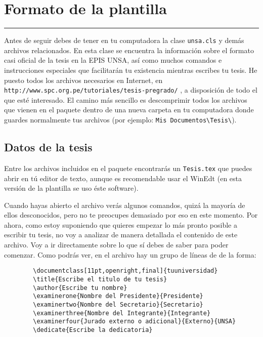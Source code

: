 \chapter{Formato de la plantilla}
\hrule \bigskip  \vspace*{1cm}

Antes de seguir debes de tener en tu computadora la clase
\verb"unsa.cls" y demás archivos relacionados. En esta clase se
encuentra la información sobre el formato casi oficial de la tesis
en la EPIS UNSA, así como muchos comandos e instrucciones
especiales que facilitarán tu existencia mientras escribes tu
tesis. He puesto todos los archivos necesarios en Internet, en
\texttt{http://www.spc.org.pe/tutoriales/tesis-pregrado/} , a
disposición de todo el que esté interesado. El camino más sencillo
es descomprimir todos los archivos que vienen en el paquete dentro
de una nueva carpeta en tu computadora donde guardes normalmente
tus archivos (por ejemplo: \verb"Mis Documentos\Tesis\").

\section{Datos de la tesis}

Entre los archivos incluidos en el paquete encontrarás un
\verb"Tesis.tex" que puedes abrir en tú editor de texto, aunque es
recomendable usar el WinEdt (en esta versión de la plantilla se
uso éste software).

Cuando hayas abierto el archivo verás algunos comandos, quizá la
mayoría de ellos desconocidos, pero no te preocupes demasiado por
eso en este momento. Por ahora, como estoy suponiendo que quieres
empezar lo más pronto posible a escribir tu tesis, no voy a
analizar de manera detallada el contenido de este archivo. Voy a
ir directamente sobre lo que sí debes de saber para poder
comenzar. Como podrás ver, en el archivo hay un grupo de líneas de
de la forma:

\begin{singlespace}
\begin{verbatim}
        \documentclass[11pt,openright,final]{tuuniversidad}
        \title{Escribe el titulo de tu tesis}
        \author{Escribe tu nombre}
        \examinerone{Nombre del Presidente}{Presidente}
        \examinertwo{Nombre del Secretario}{Secretario}
        \examinerthree{Nombre del Integrante}{Integrante}
        \examinerfour{Jurado externo o adicional}{Externo}{UNSA}
        \dedicate{Escribe la dedicatoria}
\end{verbatim}
\end{singlespace}

